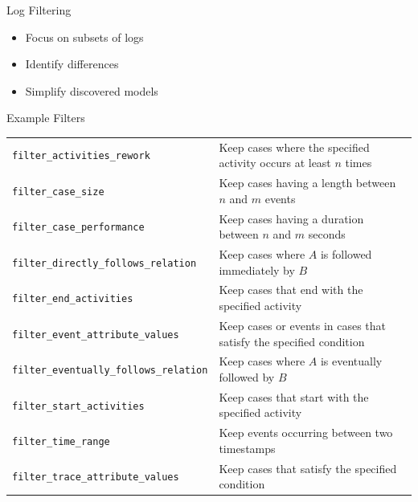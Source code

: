 \documentclass[ignorenonframetext,xcolor=x11names]{beamer}
\begin{document}
\begin{frame}[label=full]{Log Filtering}
\begin{itemize}
    \item Focus on subsets of logs
    \item Identify differences
    \item Simplify discovered models
\end{itemize}
\end{frame}

\begin{frame}[label=withcode]{Example Filters}
\scriptsize
\renewcommand{\arraystretch}{1.25}
\begin{tabularx}{\textwidth}{l|X} \hline 
\texttt{filter\_activities\_rework} & Keep cases where the specified activity occurs at least $n$ times \\
\texttt{filter\_case\_size} & Keep cases having a length between $n$ and $m$ events \\
\texttt{filter\_case\_performance} & Keep cases having a duration between $n$ and $m$ seconds \\
\texttt{filter\_directly\_follows\_relation} & Keep cases where $A$ is followed immediately by $B$ \\
\texttt{filter\_end\_activities} & Keep cases that end with the specified activity \\
\texttt{filter\_event\_attribute\_values} & Keep cases or events in cases that satisfy the specified condition \\ 
\texttt{filter\_eventually\_follows\_relation} & Keep cases where $A$ is eventually followed by $B$ \\
\texttt{filter\_start\_activities} & Keep cases that start with the specified activity \\
\texttt{filter\_time\_range} & Keep events occurring between two timestamps \\
\texttt{filter\_trace\_attribute\_values} & Keep cases that satisfy the specified condition \\ \hline
\end{tabularx}
\end{frame}
\end{document}
